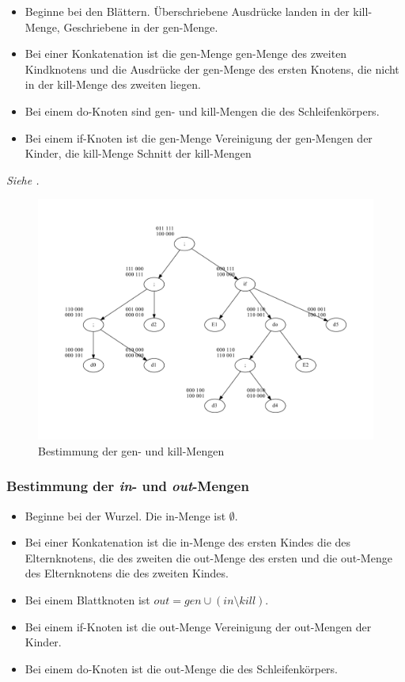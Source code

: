 \begin{itemize}
    \item Beginne bei den Blättern. Überschriebene Ausdrücke landen in der kill-Menge,
        Geschriebene in der gen-Menge.
    \item Bei einer Konkatenation ist die gen-Menge gen-Menge des zweiten Kindknotens
        und die Ausdrücke der gen-Menge des ersten Knotens, die nicht in der kill-Menge
        des zweiten liegen.
    \item Bei einem do-Knoten sind gen- und kill-Mengen die des Schleifenkörpers.
    \item Bei einem if-Knoten ist die gen-Menge Vereinigung der gen-Mengen der Kinder,
        die kill-Menge Schnitt der kill-Mengen
\end{itemize}
\textit{Siehe .}
\begin{figure}
    \centering
    \includegraphics[scale=0.45]{images/convent-genkill.pdf}
    \caption{Bestimmung der gen- und kill-Mengen}
    \label{convent:genkill}
\end{figure}

\subsubsection{Bestimmung der \textit{in}- und \textit{out}-Mengen}

\begin{itemize}
    \item Beginne bei der Wurzel. Die in-Menge ist $\emptyset$.
    \item Bei einer Konkatenation ist die in-Menge des ersten Kindes die des Elternknotens,
        die des zweiten die out-Menge des ersten und die out-Menge des Elternknotens die des
        zweiten Kindes.
    \item Bei einem Blattknoten ist $out = gen \cup (in \setminus kill)$.
    \item Bei einem if-Knoten ist die out-Menge Vereinigung der out-Mengen der Kinder.
    \item Bei einem do-Knoten ist die out-Menge die des Schleifenkörpers.
\end{itemize}

